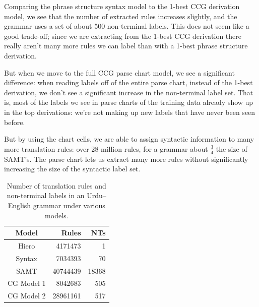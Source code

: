 \documentclass[a4paper]{article}
\begin{document}
Comparing the phrase structure syntax model to the 1-best CCG derivation model, we see that the number of extracted rules increases slightly, and the grammar uses a set of about 500 non-terminal labels. This does not seem like a good trade-off; since we are extracting from the 1-best CCG derivation there really aren't many more rules we can label than with a 1-best phrase structure derivation.

But when we move to the full CCG parse chart model, we see a significant difference: when reading labels off of the entire parse chart, instead of the 1-best derivation, we don't see a significant increase in the non-terminal label set. That is, most of the labels we see in parse charts of the training data already show up in the top derivations: we're not making up new labels that have never been seen before.

But by using the chart cells, we are able to assign syntactic information to many more translation rules: over 28 million rules, for a grammar about $\frac{3}{4}$ the size of SAMT's. The parse chart lets us extract many more rules without significantly increasing the size of the syntactic label set.

\begin{table}
\centering
\begin{tabular}{|c|r|r|}
\hline
Model & Rules & NTs\\
\hline
Hiero & 4171473 & 1\\
Syntax & 7034393 & 70\\
SAMT & 40744439 & 18368\\
CG Model 1 & 8042683 & 505\\
CG Model 2 & 28961161 & 517\\
\hline
\end{tabular}
\caption{Number of translation rules and non-terminal labels in an Urdu--English grammar under various models.\label{table:rule-count}}
\end{table}

\end{document}
